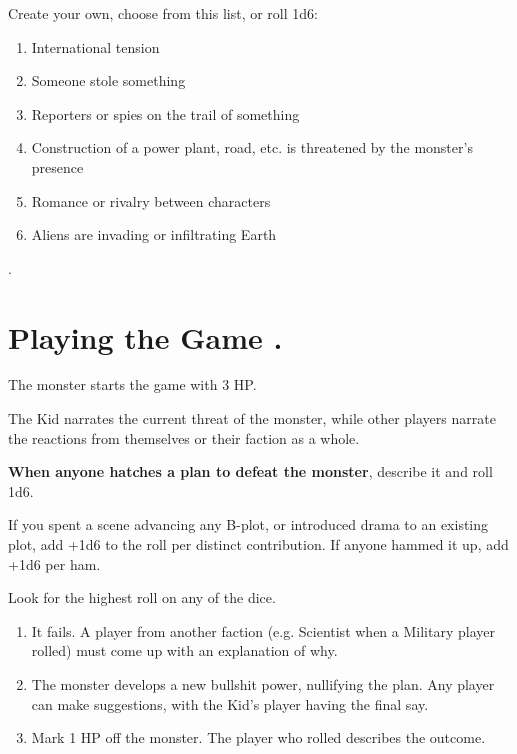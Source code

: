 \documentclass[10pt,oneside,letterpaper,landscape]{memoir}
\newcommand\rep{\leavevmode\xleaders\hbox{.}\hfill\kern0pt}
\begin{document}
\begin{multicols}{3}
Create your own, choose from this list, or roll 1d6:
\begin{enumerate}
	\item International tension
	\item Someone stole something
	\item Reporters or spies on the trail of something
	\item Construction of a power plant, road, etc. is threatened by the monster's presence
	\item Romance or rivalry between characters
	\item Aliens are invading or infiltrating Earth
\end{enumerate}

\vfill\null %

\columnbreak

{\color{white}.}
\vspace{18mm}

\section{Playing the Game \rep}

The monster starts the game with 3 HP.

The Kid narrates the current threat of the monster, while other players narrate the reactions from themselves or their faction as a whole.

\textbf{When anyone hatches a plan to defeat the monster}, describe it and roll 1d6.

If you spent a scene advancing any B-plot, or introduced drama to an existing plot, add +1d6 to the roll per distinct contribution. If anyone hammed it up, add +1d6 per ham.

Look for the highest roll on any of the dice.

\begin{enumerate}
	\item [1-3:] It fails. A player from another faction (e.g. Scientist when a Military player rolled) must come up with an explanation of why.
	\item [4-5:] The monster develops a new bullshit power, nullifying the plan. Any player can make suggestions, with the Kid's player having the final say.
	\item [6:] Mark 1 HP off the monster. The player who rolled describes the outcome.
\end{enumerate}


\end{multicols}
\end{document}
